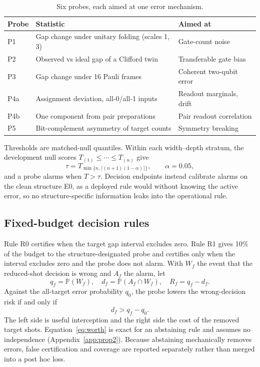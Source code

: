 \documentclass[10pt,twocolumn]{article}
\newcommand{\Prb}{\mathbb{P}}
\begin{document}
\begin{table}[t]
\centering
\caption{Six probes, each aimed at one error mechanism.}
\label{tab:probes}
\small
\begin{tabularx}{\columnwidth}{@{}lXl@{}}
\toprule
Probe & Statistic & Aimed at \\
\midrule
P1 & Gap change under unitary folding (scales 1, 3) & Gate-count noise \\
P2 & Observed vs ideal gap of a Clifford twin & Transferable gate bias \\
P3 & Gap change under 16 Pauli frames & Coherent two-qubit error \\
P4a & Assignment deviation, all-0/all-1 inputs & Readout marginals, drift \\
P4b & One component from pair preparations & Pair readout correlation \\
P5 & Bit-complement asymmetry of target counts & Symmetry breaking \\
\bottomrule
\end{tabularx}
\end{table}

Thresholds are matched-null quantiles. Within each width--depth stratum, the
development null scores $T_{(1)}\le\cdots\le T_{(n)}$ give
\begin{equation}
  \tau=T_{\min\{n,\lceil(n+1)(1-\alpha)\rceil\}},\qquad \alpha=0.05,
\end{equation}
and a probe alarms when $T>\tau$. Decision endpoints instead calibrate alarms
on the clean structure E0, as a deployed rule would without knowing the active
error, so no structure-specific information leaks into the operational rule.

\subsection{Fixed-budget decision rules}\label{sec:rules}

Rule R0 certifies when the target gap interval excludes zero. Rule R1 gives 10\%
of the budget to the structure-designated probe and certifies only when the
interval excludes zero and the probe does not alarm. With $W_f$ the event that
the reduced-shot decision is wrong and $A_f$ the alarm, let
\begin{equation}
  q_f=\Prb(W_f),\quad d_f=\Prb(A_f\cap W_f),\quad R_f=q_f-d_f.
\end{equation}
Against the all-target error probability $q_0$, the probe lowers the
wrong-decision risk if and only if
\begin{equation}
  d_f>q_f-q_0.
  \label{eq:worth}
\end{equation}
The left side is useful interception and the right side the cost of the
removed target shots. Equation~\eqref{eq:worth} is exact for an abstaining rule
and assumes no independence (Appendix~\ref{app:prop2}). Because abstaining
mechanically removes errors, false certification and coverage are reported
separately rather than merged into a post hoc loss.
\end{document}
